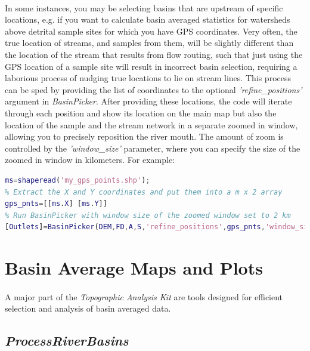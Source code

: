 \paragraph{}In some instances, you may be selecting basins that are upstream of specific locations, e.g. if you want to calculate basin averaged statistics for watersheds above detrital sample sites for which you have GPS coordinates. Very often, the true location of streams, and samples from them, will be slightly different than the location of the stream that results from flow routing, such that just using the GPS location of a sample site will result in incorrect basin selection, requiring a laborious process of nudging true locations to lie on stream lines. This process can be sped by providing the list of coordinates to the optional \textit{'refine\_positions'} argument in \textit{BasinPicker}. After providing these locations, the code will iterate through each position and show its location on the main map but also the location of the sample and the stream network in a separate zoomed in window, allowing you to precisely reposition the river mouth. The amount of zoom is controlled by the \textit{'window\_size'} parameter, where you can specify the size of the zoomed in window in kilometers. For example:

\begin{lstlisting}[language=Matlab]
% Load a shapefile containing your GPS coordinates
ms=shaperead('my_gps_points.shp');
% Extract the X and Y coordinates and put them into a m x 2 array
gps_pnts=[[ms.X] [ms.Y]]
% Run BasinPicker with window size of the zoomed window set to 2 km
[Outlets]=BasinPicker(DEM,FD,A,S,'refine_positions',gps_pnts,'window_size',2);
\end{lstlisting}

\section{Basin Average Maps and Plots}

\paragraph{}A major part of the \textit{Topographic Analysis Kit} are tools designed for efficient selection and analysis of basin averaged data.

\subsection{\textit{ProcessRiverBasins}} \label{sec:PrcRvBsn}

